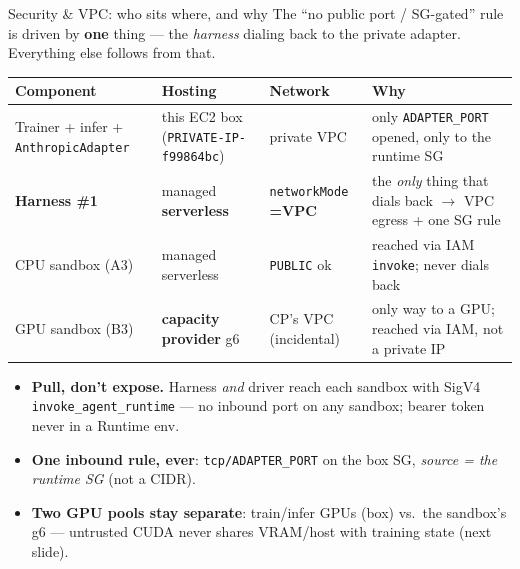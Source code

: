 \documentclass[aspectratio=169]{beamer}
\begin{document}
\begin{frame}{Security \& VPC: who sits where, and why}
  \footnotesize The ``no public port / SG-gated'' rule is driven by \textbf{one} thing --- the
  \emph{harness} dialing back to the private adapter. Everything else follows from that.
  \vspace{0.1em}
  \begin{center}\scriptsize
  \begin{tabular}{@{}p{2.9cm}p{2.4cm}p{2.0cm}p{3.4cm}@{}}
    \toprule
    \textbf{Component} & \textbf{Hosting} & \textbf{Network} & \textbf{Why} \\
    \midrule
    Trainer + infer + \texttt{AnthropicAdapter} & this EC2 box (\texttt{PRIVATE-IP-f99864bc}) & private VPC &
      only \texttt{ADAPTER\_PORT} opened, only to the runtime SG \\
    \textbf{Harness \#1} & managed \textbf{serverless} & \texttt{networkMode} \textbf{=VPC} &
      the \emph{only} thing that dials back $\to$ VPC egress + one SG rule \\
    CPU sandbox (A3) & managed serverless & \texttt{PUBLIC} ok &
      reached via IAM \texttt{invoke}; never dials back \\
    GPU sandbox (B3) & \textbf{capacity provider} g6 & CP's VPC (incidental) &
      only way to a GPU; reached via IAM, not a private IP \\
    \bottomrule
  \end{tabular}
  \end{center}
  \vspace{0.1em}
  \begin{itemize}\setlength\itemsep{0.05em}
    \item \textbf{Pull, don't expose.} Harness \emph{and} driver reach each sandbox with SigV4
      \texttt{invoke\_agent\_runtime} --- no inbound port on any sandbox; bearer token never in a Runtime env.
    \item \textbf{One inbound rule, ever}: \texttt{tcp/ADAPTER\_PORT} on the box SG, \emph{source = the
      runtime SG} (not a CIDR).
    \item \textbf{Two GPU pools stay separate}: train/infer GPUs (box) vs.\ the sandbox's g6 ---
      untrusted CUDA never shares VRAM/host with training state (next slide).
  \end{itemize}
\end{frame}
\end{document}
